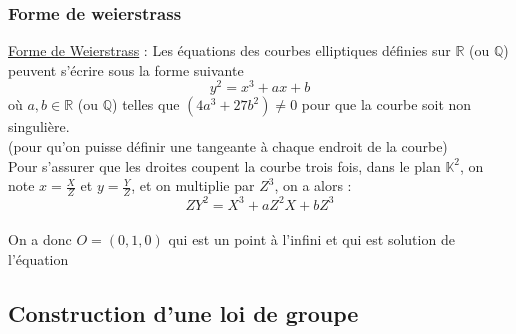 \documentclass[
	11pt, %
]{beamer}
\begin{document}
%	
%

\begin{frame}
	\frametitle{Forme de weierstrass}
	
	\underline{Forme de Weierstrass} :
	Les équations des courbes elliptiques définies sur $\mathbb{R}$ (ou $\mathbb{Q}$) peuvent s'écrire sous la forme suivante
	$$\boxed{y^2 = x^3 + ax + b}$$ 
	où $a,b \in \mathbb{R}$ (ou $\mathbb{Q}$) telles que $(4a^3 + 27b^2) \neq 0$ pour que la courbe soit non singulière.\\
	(pour qu'on puisse définir une tangeante à chaque endroit de la courbe)\\
	\bigskip
	Pour s'assurer que les droites coupent la courbe trois fois, dans le plan $\mathbb{K}^2$, on note $x = \frac{X}{Z}$ et $y = \frac{Y}{Z}$, et on multiplie par $Z^3$, on a alors :
	$$ZY^2 = X^3 + aZ^2X + bZ^3$$\\
	On a donc $O = (0,1,0)$ qui est un point à l'infini
	et qui est solution de l'équation

\end{frame}

\subsection{Construction d'une loi de groupe}
\end{document}
